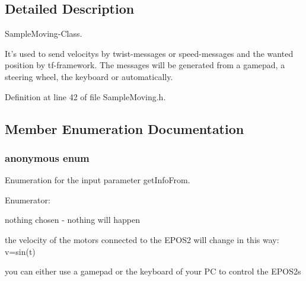 \subsection{Detailed Description}
Sample\-Moving-\/\-Class. 

It's used to send velocitys by twist-\/messages or speed-\/messages and the wanted position by tf-\/framework. The messages will be generated from a gamepad, a steering wheel, the keyboard or automatically. 

Definition at line 42 of file Sample\-Moving.\-h.



\subsection{Member Enumeration Documentation}
\hypertarget{classSampleMoving_a41123bbf6a4408e82424c92a414fa524}{\subsubsection[{anonymous enum}]{\setlength{\rightskip}{0pt plus 5cm}anonymous enum}}\label{classSampleMoving_a41123bbf6a4408e82424c92a414fa524}


Enumeration for the input parameter get\-Info\-From. 

\begin{Desc}
\item[Enumerator\-: ]\par
\begin{description}
\item[{\em 
\hypertarget{classSampleMoving_a41123bbf6a4408e82424c92a414fa524a7c0a083c39ec97797c0b28909fa3474b}{nodrive}\label{classSampleMoving_a41123bbf6a4408e82424c92a414fa524a7c0a083c39ec97797c0b28909fa3474b}
}]nothing chosen -\/ nothing will happen \item[{\em 
\hypertarget{classSampleMoving_a41123bbf6a4408e82424c92a414fa524a40b19ec7388083907df9c6d5284e89cd}{sinus}\label{classSampleMoving_a41123bbf6a4408e82424c92a414fa524a40b19ec7388083907df9c6d5284e89cd}
}]the velocity of the motors connected to the E\-P\-O\-S2 will change in this way\-: v=sin(t) \item[{\em 
\hypertarget{classSampleMoving_a41123bbf6a4408e82424c92a414fa524a965c7cf26ddac600016e6d8e003bb70c}{human\-Interface}\label{classSampleMoving_a41123bbf6a4408e82424c92a414fa524a965c7cf26ddac600016e6d8e003bb70c}
}]you can either use a gamepad or the keyboard of your P\-C to control the E\-P\-O\-S2s \end{description}
\end{Desc}



